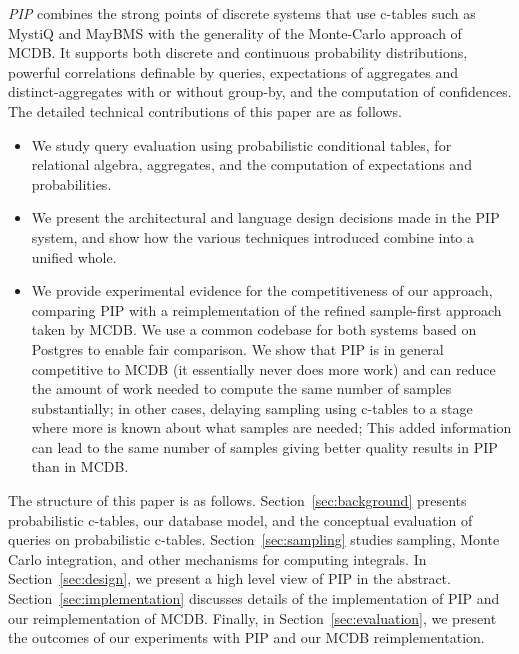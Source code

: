 {\em PIP}\/ combines the strong points of discrete systems that use c-tables such as MystiQ and MayBMS with the generality of
the Monte-Carlo approach of MCDB.  It supports both discrete and continuous probability distributions, powerful correlations definable by queries, expectations of aggregates and distinct-aggregates with or without  group-by,  and the computation of confidences. The detailed technical contributions of this paper are as follows.


\begin{itemize}
\addtolength{\topsep}{-0.3ex}
\addtolength{\labelsep}{-0.3ex}
\addtolength{\itemsep}{-1ex}
\item
We study query evaluation using probabilistic conditional tables, for
relational algebra, aggregates, and the computation of expectations and
probabilities.

\item
We present the architectural and language design decisions made in the
PIP system, and show how the various techniques introduced combine into
a unified whole.

\item
We provide experimental evidence for the competitiveness of our approach, comparing PIP with a reimplementation of the refined sample-first approach taken by MCDB.  We use a common codebase for both systems based on Postgres to enable fair comparison. We show that PIP is in general competitive to MCDB (it essentially never does more work) and can reduce the amount of work needed to compute the same number of samples substantially; in other cases, delaying sampling using c-tables to a stage where more is known about what samples are needed; This added information can lead to the same number of samples giving better quality results in PIP than in MCDB.
\end{itemize}

The structure of this paper is as follows. Section~\ref{sec:background} presents probabilistic c-tables, our database model, and the conceptual  evaluation of queries on probabilistic c-tables. Section~\ref{sec:sampling} studies sampling, Monte
Carlo integration, and other mechanisms for computing integrals.  In Section~\ref{sec:design}, we present a high level view of PIP in the abstract.   Section~\ref{sec:implementation} discusses details of the implementation of PIP and our reimplementation of MCDB.  Finally, in Section~\ref{sec:evaluation}, we present the outcomes of our experiments with PIP and our MCDB reimplementation.
